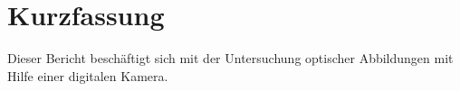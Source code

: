 \section{Kurzfassung}

	Dieser Bericht beschäftigt sich mit der Untersuchung optischer Abbildungen mit Hilfe einer digitalen Kamera.
	
